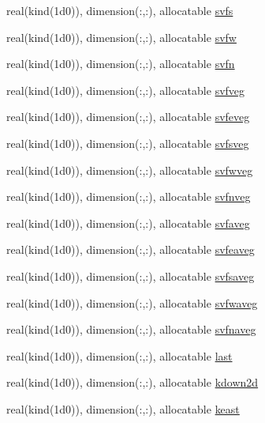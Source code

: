 \begin{DoxyCompactItemize}
\item 
real(kind(1d0)), dimension(\+:,\+:), allocatable \hyperlink{namespacematsize_a13810d151375d64bd53a45cd89fad066}{svfs}
\item 
real(kind(1d0)), dimension(\+:,\+:), allocatable \hyperlink{namespacematsize_a2741fe4703b92bb6ec505998bace4876}{svfw}
\item 
real(kind(1d0)), dimension(\+:,\+:), allocatable \hyperlink{namespacematsize_a9be189162686f197e78ed45b00840619}{svfn}
\item 
real(kind(1d0)), dimension(\+:,\+:), allocatable \hyperlink{namespacematsize_a6017bc4aa42fb2d8ee48357bcdfe5cc0}{svfveg}
\item 
real(kind(1d0)), dimension(\+:,\+:), allocatable \hyperlink{namespacematsize_a0f7143b0902f59ee105a54c791da8bae}{svfeveg}
\item 
real(kind(1d0)), dimension(\+:,\+:), allocatable \hyperlink{namespacematsize_abb71084c2bde226d0a5b7227fd1fc5ce}{svfsveg}
\item 
real(kind(1d0)), dimension(\+:,\+:), allocatable \hyperlink{namespacematsize_ae38605d352d15e1892af2d300eed4767}{svfwveg}
\item 
real(kind(1d0)), dimension(\+:,\+:), allocatable \hyperlink{namespacematsize_a7bfc9412546968d3a74b4956b47c8b44}{svfnveg}
\item 
real(kind(1d0)), dimension(\+:,\+:), allocatable \hyperlink{namespacematsize_a8d3d2ca849f0c0098a529191de39e6e2}{svfaveg}
\item 
real(kind(1d0)), dimension(\+:,\+:), allocatable \hyperlink{namespacematsize_abd5b108fa6d58f69e170177ddc18ee1e}{svfeaveg}
\item 
real(kind(1d0)), dimension(\+:,\+:), allocatable \hyperlink{namespacematsize_adecb9ebed13e9583195d044af20c81c6}{svfsaveg}
\item 
real(kind(1d0)), dimension(\+:,\+:), allocatable \hyperlink{namespacematsize_a3633eecab7a13f6237b02654e68b38be}{svfwaveg}
\item 
real(kind(1d0)), dimension(\+:,\+:), allocatable \hyperlink{namespacematsize_a258fb6132f8bd0d53c601353e796c424}{svfnaveg}
\item 
real(kind(1d0)), dimension(\+:,\+:), allocatable \hyperlink{namespacematsize_ab5b5bdd8732edafafedd05776e25e011}{last}
\item 
real(kind(1d0)), dimension(\+:,\+:), allocatable \hyperlink{namespacematsize_a965c1a4db75855ca038aef657921cec9}{kdown2d}
\item 
real(kind(1d0)), dimension(\+:,\+:), allocatable \hyperlink{namespacematsize_a27c05e9fb7688530f45b12163914f2f4}{keast}

\end{DoxyCompactItemize}
